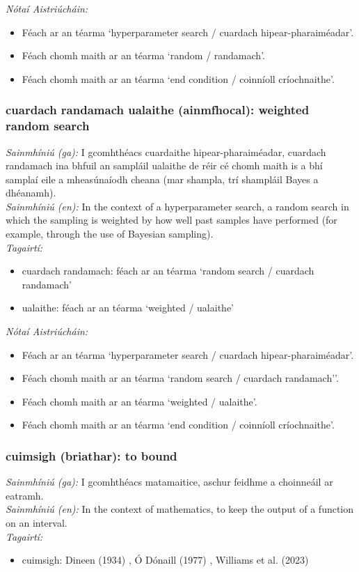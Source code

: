  \noindent \textit{Nótaí Aistriúcháin:}
\begin{itemize}
	\item Féach ar an téarma `hyperparameter search / cuardach hipear-pharaiméadar'.
	\item Féach chomh maith ar an téarma `random / randamach'.
	\item Féach chomh maith ar an téarma `end condition / coinníoll críochnaithe'.
\end{itemize}


\subsubsection*{cuardach randamach ualaithe (ainmfhocal): weighted random search}
 \noindent \textit{Sainmhíniú (ga):} I gcomhthéacs cuardaithe hipear-pharaiméadar, cuardach randamach ina bhfuil an sampláil ualaithe de réir cé chomh maith is a bhí samplaí eile a mheasúnaíodh cheana (mar shampla, trí shampláil Bayes a dhéanamh).
\\
 \noindent \textit{Sainmhíniú (en):} In the context of a hyperparameter search, a random search in which the sampling is weighted by how well past samples have performed (for example, through the use of Bayesian sampling).
\\
 \noindent \textit{Tagairtí:}
\begin{itemize}
	\item cuardach randamach: féach ar an téarma `random search / cuardach randamach'
	\item ualaithe: féach ar an téarma `weighted / ualaithe'
\end{itemize}

 \noindent \textit{Nótaí Aistriúcháin:}
\begin{itemize}
	\item Féach ar an téarma `hyperparameter search / cuardach hipear-pharaiméadar'.
	\item Féach chomh maith ar an téarma `random search / cuardach randamach''.
	\item Féach chomh maith ar an téarma `weighted / ualaithe'.
	\item Féach chomh maith ar an téarma `end condition / coinníoll críochnaithe'.
\end{itemize}


\subsubsection*{cuimsigh (briathar): to bound}
 \noindent \textit{Sainmhíniú (ga):} I gcomhthéacs matamaitice, aschur feidhme a choinneáil ar eatramh.
\\
 \noindent \textit{Sainmhíniú (en):} In the context of mathematics, to keep the output of a function on an interval.
\\
 \noindent \textit{Tagairtí:}
\begin{itemize}
	\item cuimsigh: Dineen (1934) \cite{dineen}, Ó Dónaill (1977) \cite{odonaill}, Williams et al. (2023) \cite{storchiste}
\end{itemize}

